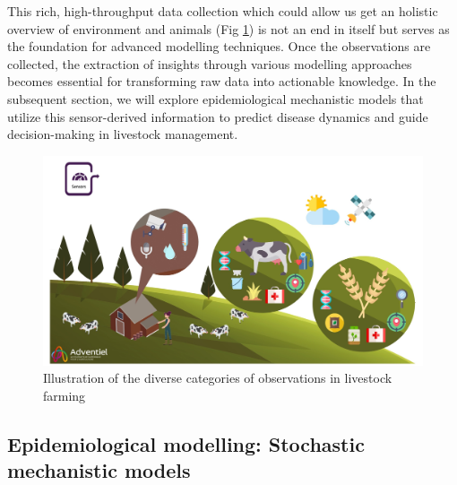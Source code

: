 This rich, high-throughput data collection which could allow us get an holistic overview of environment and animals (Fig \ref{fig:chap1-sensors}) is not an end in itself but serves as the foundation for advanced modelling techniques. Once the observations are collected, the extraction of insights through various modelling approaches becomes essential for transforming raw data into actionable knowledge. In the subsequent section, we will explore epidemiological mechanistic models that utilize this sensor-derived information to predict disease dynamics and guide decision-making in livestock management.

\begin{figure}
  \includegraphics[width=\linewidth]{figures/chap1/chap1-sensors.jpg}
  \caption{Illustration of the diverse categories of observations in livestock farming}
  \label{fig:chap1-sensors}
\end{figure}
\newpage





\subsection{Epidemiological modelling: Stochastic mechanistic models}

